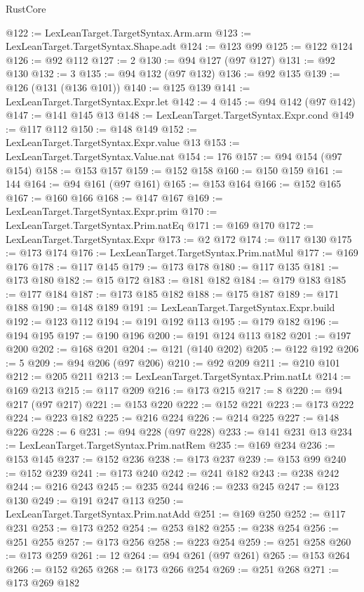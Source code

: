 \begin{lexlean}{RustCore}
\begin{coremodule}
@122 := LexLeanTarget.TargetSyntax.Arm.arm
@123 := LexLeanTarget.TargetSyntax.Shape.adt
@124 := @123 @99
@125 := @122 @124
@126 := @92 @112
@127 := 2
@130 := @94 @127 (@97 @127)
@131 := @92 @130
@132 := 3
@135 := @94 @132 (@97 @132)
@136 := @92 @135
@139 := @126 (@131 (@136 @101))
@140 := @125 @139
@141 := LexLeanTarget.TargetSyntax.Expr.let
@142 := 4
@145 := @94 @142 (@97 @142)
@147 := @141 @145 @13
@148 := LexLeanTarget.TargetSyntax.Expr.cond
@149 := @117 @112
@150 := @148 @149
@152 := LexLeanTarget.TargetSyntax.Expr.value @13
@153 := LexLeanTarget.TargetSyntax.Value.nat
@154 := 176
@157 := @94 @154 (@97 @154)
@158 := @153 @157
@159 := @152 @158
@160 := @150 @159
@161 := 144
@164 := @94 @161 (@97 @161)
@165 := @153 @164
@166 := @152 @165
@167 := @160 @166
@168 := @147 @167
@169 := LexLeanTarget.TargetSyntax.Expr.prim
@170 := LexLeanTarget.TargetSyntax.Prim.natEq
@171 := @169 @170
@172 := LexLeanTarget.TargetSyntax.Expr
@173 := @2 @172
@174 := @117 @130
@175 := @173 @174
@176 := LexLeanTarget.TargetSyntax.Prim.natMul
@177 := @169 @176
@178 := @117 @145
@179 := @173 @178
@180 := @117 @135
@181 := @173 @180
@182 := @15 @172
@183 := @181 @182
@184 := @179 @183
@185 := @177 @184
@187 := @173 @185 @182
@188 := @175 @187
@189 := @171 @188
@190 := @148 @189
@191 := LexLeanTarget.TargetSyntax.Expr.build
@192 := @123 @112
@194 := @191 @192 @113
@195 := @179 @182
@196 := @194 @195
@197 := @190 @196
@200 := @191 @124 @113 @182
@201 := @197 @200
@202 := @168 @201
@204 := @121 (@140 @202)
@205 := @122 @192
@206 := 5
@209 := @94 @206 (@97 @206)
@210 := @92 @209
@211 := @210 @101
@212 := @205 @211
@213 := LexLeanTarget.TargetSyntax.Prim.natLt
@214 := @169 @213
@215 := @117 @209
@216 := @173 @215
@217 := 8
@220 := @94 @217 (@97 @217)
@221 := @153 @220
@222 := @152 @221
@223 := @173 @222
@224 := @223 @182
@225 := @216 @224
@226 := @214 @225
@227 := @148 @226
@228 := 6
@231 := @94 @228 (@97 @228)
@233 := @141 @231 @13
@234 := LexLeanTarget.TargetSyntax.Prim.natRem
@235 := @169 @234
@236 := @153 @145
@237 := @152 @236
@238 := @173 @237
@239 := @153 @99
@240 := @152 @239
@241 := @173 @240
@242 := @241 @182
@243 := @238 @242
@244 := @216 @243
@245 := @235 @244
@246 := @233 @245
@247 := @123 @130
@249 := @191 @247 @113
@250 := LexLeanTarget.TargetSyntax.Prim.natAdd
@251 := @169 @250
@252 := @117 @231
@253 := @173 @252
@254 := @253 @182
@255 := @238 @254
@256 := @251 @255
@257 := @173 @256
@258 := @223 @254
@259 := @251 @258
@260 := @173 @259
@261 := 12
@264 := @94 @261 (@97 @261)
@265 := @153 @264
@266 := @152 @265
@268 := @173 @266 @254
@269 := @251 @268
@271 := @173 @269 @182

\end{coremodule}
\end{lexlean}
